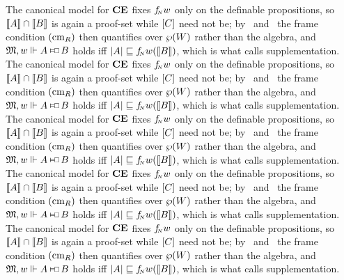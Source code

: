 \documentclass[letterpaper,12pt]{article}
\begin{document}
The canonical model for $\textup{\textbf{CE}}$ fixes ${f_{{\mkern-3.6mu\scriptscriptstyle N}}}{w}$ only on the definable propositions, so $\llbracket A\rrbracket\cap\llbracket B\rrbracket$ is again a proof-set while $[C]$ need not be; by \CMl\ and \CMr\ the frame condition $(\textnormal{cm}_{R})$ then quantifies over $\wp(W)$ rather than the algebra, and $\M,w\trues A\cnecs B$ holds iff $|A|\sqsubseteq{f_{{\mkern-3.6mu\scriptscriptstyle N}}}{w}(\llbracket B\rrbracket)$, which is what \cite{chellas1980} calls supplementation. The canonical model for $\textup{\textbf{CE}}$ fixes ${f_{{\mkern-3.6mu\scriptscriptstyle N}}}{w}$ only on the definable propositions, so $\llbracket A\rrbracket\cap\llbracket B\rrbracket$ is again a proof-set while $[C]$ need not be; by \CMl\ and \CMr\ the frame condition $(\textnormal{cm}_{R})$ then quantifies over $\wp(W)$ rather than the algebra, and $\M,w\trues A\cnecs B$ holds iff $|A|\sqsubseteq{f_{{\mkern-3.6mu\scriptscriptstyle N}}}{w}(\llbracket B\rrbracket)$, which is what \cite{chellas1980} calls supplementation. The canonical model for $\textup{\textbf{CE}}$ fixes ${f_{{\mkern-3.6mu\scriptscriptstyle N}}}{w}$ only on the definable propositions, so $\llbracket A\rrbracket\cap\llbracket B\rrbracket$ is again a proof-set while $[C]$ need not be; by \CMl\ and \CMr\ the frame condition $(\textnormal{cm}_{R})$ then quantifies over $\wp(W)$ rather than the algebra, and $\M,w\trues A\cnecs B$ holds iff $|A|\sqsubseteq{f_{{\mkern-3.6mu\scriptscriptstyle N}}}{w}(\llbracket B\rrbracket)$, which is what \cite{chellas1980} calls supplementation. The canonical model for $\textup{\textbf{CE}}$ fixes ${f_{{\mkern-3.6mu\scriptscriptstyle N}}}{w}$ only on the definable propositions, so $\llbracket A\rrbracket\cap\llbracket B\rrbracket$ is again a proof-set while $[C]$ need not be; by \CMl\ and \CMr\ the frame condition $(\textnormal{cm}_{R})$ then quantifies over $\wp(W)$ rather than the algebra, and $\M,w\trues A\cnecs B$ holds iff $|A|\sqsubseteq{f_{{\mkern-3.6mu\scriptscriptstyle N}}}{w}(\llbracket B\rrbracket)$, which is what \cite{chellas1980} calls supplementation. The canonical model for $\textup{\textbf{CE}}$ fixes ${f_{{\mkern-3.6mu\scriptscriptstyle N}}}{w}$ only on the definable propositions, so $\llbracket A\rrbracket\cap\llbracket B\rrbracket$ is again a proof-set while $[C]$ need not be; by \CMl\ and \CMr\ the frame condition $(\textnormal{cm}_{R})$ then quantifies over $\wp(W)$ rather than the algebra, and $\M,w\trues A\cnecs B$ holds iff $|A|\sqsubseteq{f_{{\mkern-3.6mu\scriptscriptstyle N}}}{w}(\llbracket B\rrbracket)$, which is what \cite{chellas1980} calls supplementation.
\end{document}
